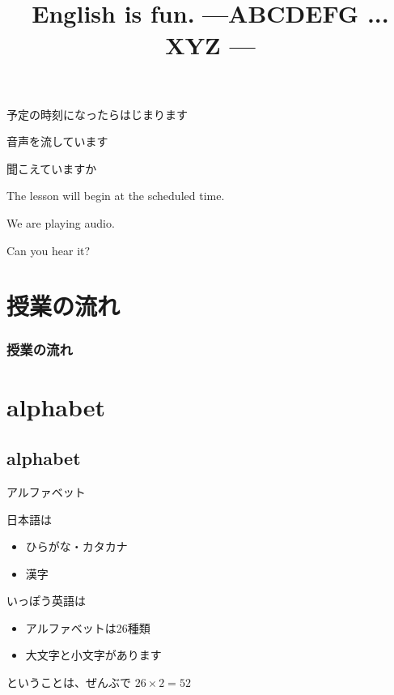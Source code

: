\documentclass[aspectratio=169,xcolor={dvipsnames,table}]{beamer}
\title{English is fun.\,\,{}---ABCDEFG ... XYZ ---}
\author{}
\institute[]{}
\date[]
\begin{document}
\begin{frame}{}
\label{section}
\thispagestyle{empty}
\Large

\raggedright

予定の時刻になったらはじまります

\textbullet  音声を流しています

\textbullet  聞こえていますか　

\vfill

\raggedleft

The lesson will begin at the scheduled time.

\vspace{-6pt}

We are playing audio.

\vspace{-6pt}

Can you hear it?
\end{frame}

\begin{frame}
\label{section-1}
\thispagestyle{empty}
\titlepage
\end{frame}


\section*{授業の流れ}
\begin{frame}[plain]
  \frametitle{授業の流れ}
  \tableofcontents
\end{frame}

\section{alphabet}
\subsection{alphabet}
\begin{frame}[plain]{アルファベット}
\Large


日本語は\pause

\begin{itemize}
 \item ひらがな・カタカナ
 \item 漢字
\end{itemize}

\pause
いっぽう英語は\pause
\begin{itemize}
 \item アルファベットは26種類
 \item 大文字と小文字があります
\end{itemize}

\pause
ということは、ぜんぶで
$26\times2=52$


\end{frame}
\end{document}
